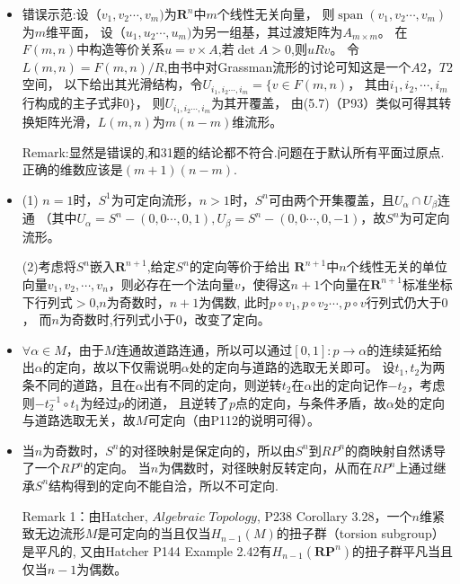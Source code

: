 \begin{itemize}
    Remark:经典错误,默认所有向量丛都是平凡丛.不能排除Mobius丛.应当具体构造坐标覆盖来说明.

    \item[32.]
    错误示范:设$（v_1,v_2\cdots,v_m)$为$\mathbf{R}^{n}$中$m$个线性无关向量，
    则$\operatorname{span}(v_1,v_2\cdots,v_m)$为$m$维平面，
    设$（u_1,u_2\cdots,u_m)$为另一组基，其过渡矩阵为$A_{m\times m}$。
    在$F(m,n)$中构造等价关系$u=v\times A$,若$\det A> 0$,则$uRv$。
    令$L(m,n)=F(m,n)/R$,由书中对Grassman流形的讨论可知这是一个$A2，T2$空间，
    以下给出其光滑结构，令$U_{i_1,i_2\cdots,i_m}=\{v\in F(m,n)$，
    其由$i_1,i_2,\cdots,i_m$行构成的主子式非$0\}$，
    则$U_{i_1,i_2\cdots,i_m}$为其开覆盖，
    由(5.7)（P93）类似可得其转换矩阵光滑，$L(m,n)$为$m(n-m)$维流形。

    Remark:显然是错误的,和31题的结论都不符合.问题在于默认所有平面过原点.正确的维数应该是$(m+1)(n-m)$.

    \item[33.]
    (1) $n=1$时，$S^1$为可定向流形，$n>1$时，$S^n$可由两个开集覆盖，且$U_{\alpha}\cap U_{\beta}$连通
    （其中$U_{\alpha}=S^n-(0,0\cdots,0,1),U_{\beta}=S^n-(0,0\cdots,0,-1)$，故$S^n$为可定向流形。
    
    (2)考虑将$S^n$嵌入$\mathbf{R}^{n+1}$,给定$S^n$的定向等价于给出 
      $\mathbf{R}^{n+1}$中$n$个线性无关的单位向量$v_1,v_2,\cdots,v_n$，则必存在一个法向量$v$，使得这$n+1$个向量在$\mathbf{R}^{n+1}$标准坐标下行列式$>0$,$n$为奇数时，$n+1$为偶数,
      此时$p\circ v_1,p\circ v_2\cdots,p\circ v$行列式仍大于$0$，
      而$n$为奇数时,行列式小于$0$，改变了定向。

    \item[34.]
    $\forall {\alpha}\in M$，由于$M$连通故道路连通，所以可以通过$[0,1]:p\rightarrow {\alpha}$的连续延拓给出${\alpha}$的定向，故以下仅需说明${\alpha}$处的定向与道路的选取无关即可。
    设$t_1,t_2$为两条不同的道路，且在$\alpha$出有不同的定向，则逆转$t_2$在${\alpha}$出的定向记作$-t_2$，考虑则$-t_2^{-1}\circ t_1$为经过$p$的闭道，
    且逆转了$p$点的定向，与条件矛盾，故$\alpha$处的定向与道路选取无关，故$M$可定向（由P112的说明可得）。

    \item[35.]
    当$n$为奇数时，$S^n$的对径映射是保定向的，所以由$S^n$到$RP^n$的商映射自然诱导了一个$RP^n$的定向。
    当$n$为偶数时，对径映射反转定向，从而在$RP^n$上通过继承$S^n$结构得到的定向不能自洽，所以不可定向.

    Remark 1：由Hatcher, $Algebraic$ $Topology$, P238 Corollary 3.28，一个$n$维紧致无边流形$M$是可定向的当且仅当$H_{n-1}(M)$的扭子群（torsion subgroup）是平凡的,
    又由Hatcher P144 Example 2.42有$H_{n-1}(\mathbf{RP}^n)$的扭子群平凡当且仅当$n-1$为偶数。


\end{itemize}
